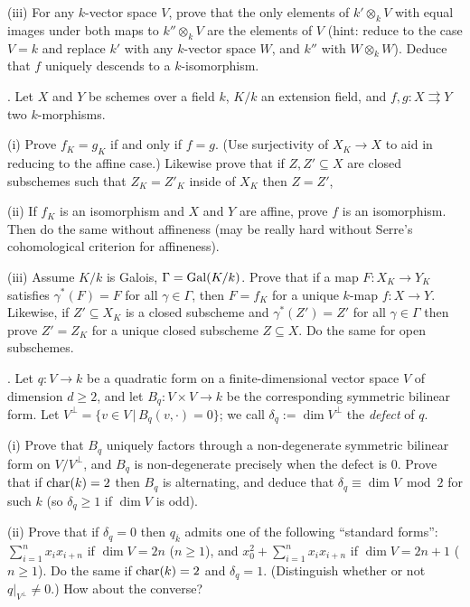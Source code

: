 \documentclass[10pt]{amsart}
\begin{document}
(iii) For any $k$-vector space $V$, prove that the only elements of
$k' \otimes_k V$ with equal images under both maps to $k'' \otimes_k V$ are the elements
of $V$ (hint: reduce to the case $V = k$ and replace $k'$ with any $k$-vector space
$W$, and $k''$ with $W \otimes_k W$).  Deduce that $f$
uniquely descends to a $k$-isomorphism.

\medskip{}.    Let $X$ and $Y$ be schemes over a field $k$, $K/k$ an extension field,
and $f, g:X \rightrightarrows Y$ 
two $k$-morphisms. 

(i) Prove $f_K = g_K$ if and only if $f = g$.  (Use surjectivity of
$X_K \rightarrow X$ to aid in reducing to the affine case.)  Likewise
prove that if $Z, Z' \subseteq X$ are closed subschemes such that $Z_K = Z'_K$ inside
of $X_K$ then $Z = Z'$, 

(ii) If $f_K$ is an isomorphism and $X$ and $Y$ are affine, prove $f$ is an isomorphism.
Then do the same without affineness (may be really hard without Serre's
cohomological criterion for affineness). 

(iii) Assume $K/k$ is Galois, $\Gamma = {\rm{Gal}}(K/k)$.  Prove that if
a map $F:X_K \rightarrow Y_K$ satisfies $\gamma^{\ast}(F) = F$ for all
$\gamma \in \Gamma$, then $F = f_K$ for a unique $k$-map $f:X \rightarrow Y$.
Likewise, if $Z' \subseteq X_K$ is a closed subscheme
and $\gamma^{\ast}(Z') = Z'$ for all $\gamma \in \Gamma$ then prove
$Z' = Z_K$ for a unique closed subscheme $Z \subseteq X$. Do the same for open subschemes. 

\medskip{}. Let $q:V \rightarrow k$ be a quadratic form on a finite-dimensional vector space
$V$ of dimension $d \ge 2$, and let 
$B_q:V \times V \rightarrow k$ be the corresponding symmetric bilinear form.
Let $V^{\perp} = \{v \in V\,|\,B_q(v,\cdot)= 0\}$; we call $\delta_q := \dim V^{\perp}$ the {\em defect}
of $q$.

(i) Prove that $B_q$ uniquely factors through a non-degenerate symmetric bilinear form
on $V/V^{\perp}$, and $B_q$ is non-degenerate precisely when the defect is 0. 
Prove that if ${\rm{char}}(k) = 2$ then $B_q$ is alternating, and deduce
that $\delta_q \equiv \dim V \bmod 2$ for such $k$ (so $\delta_q \ge 1$ if $\dim V$ is odd). 

(ii) Prove that if $\delta_q = 0$ then $q_{\overline{k}}$ 
admits one of the following ``standard forms'':
$\sum_{i=1}^n x_i x_{i+n}$ if $\dim V = 2n$ ($n \ge 1$), and 
$x_0^2 + \sum_{i=1}^n x_i x_{i+n}$ if $\dim V = 2n+1$ ($n \ge 1$). 
Do the same if ${\rm{char}}(k) = 2$ and $\delta_q = 1$. (Distinguish whether or
not $q|_{V^{\perp}} \ne 0$.) 
How about the converse?  
\end{document}
